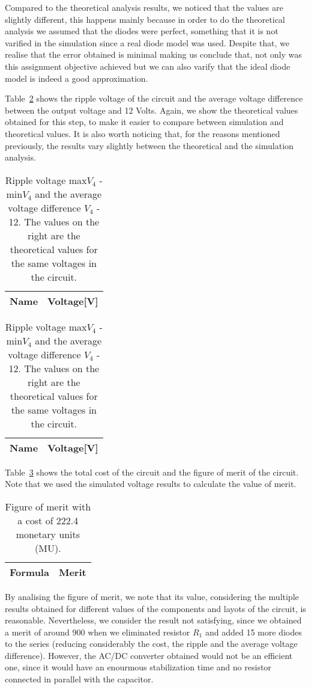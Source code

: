 	Compared to the theoretical analysis results, we noticed that the values are slightly different, this happens mainly because in order to do the theoretical analysis we assumed that the diodes were perfect, something that it is not varified in the simulation since a real diode model was used. Despite that, we realise that the error obtained is minimal making us conclude that, not only was this assignment objective achieved but we can also varify that the ideal diode model is indeed a good approximation.


Table~\ref{tab2:op} shows the ripple voltage of the circuit and the average voltage difference
between the output voltage and 12 Volts. Again, we show the theoretical values obtained for this step, 
to make it easier to compare between simulation and theoretical values. It is also worth noticing that, for the reasons mentioned previously, the results vary slightly between the theoretical and the simulation analysis.


\begin{table}[H]
  \centering
  \begin{tabular}{|l|r|}
    \hline    
    {\bf Name} & {\bf Voltage[V]} \\ \hline
    
  \end{tabular}
  \begin{tabular}{|l|r|}
    \hline    
    {\bf Name} & {\bf Voltage[V]} \\ \hline
    
  \end{tabular}
  \caption{Ripple voltage max$V_4$ - min$V_4$ and the average voltage difference $V_4$ - 12. The values on the right are the theoretical 
  values for the same voltages in the circuit.}
  \label{tab2:op}
\end{table}


Table~\ref{tab3:op} shows the total cost of the circuit and the figure of merit of the circuit. 
Note that we used the simulated voltage results to calculate the value of merit.


\begin{table}[H]
  \centering
  \begin{tabular}{|l|r|}
    \hline    
    {\bf Formula} & {\bf Merit} \\ \hline
    
  \end{tabular}
  \caption{Figure of merit with a cost of 222.4 monetary units (MU).}
  \label{tab3:op}
\end{table}

By analising the figure of merit, we note that its value, considering the multiple results obtained for different values of the components and layots of the circuit, is
reasonable. Nevertheless, we consider the result not satisfying, since we obtained a merit of around 900 when we eliminated resistor $R_1$ and added 15 more diodes to the series
(reducing considerably the cost, the ripple and the average voltage difference). However, the AC/DC converter obtained would not be an efficient one, since it would have an enourmous
stabilization time and no resistor connected in parallel with the capacitor.


